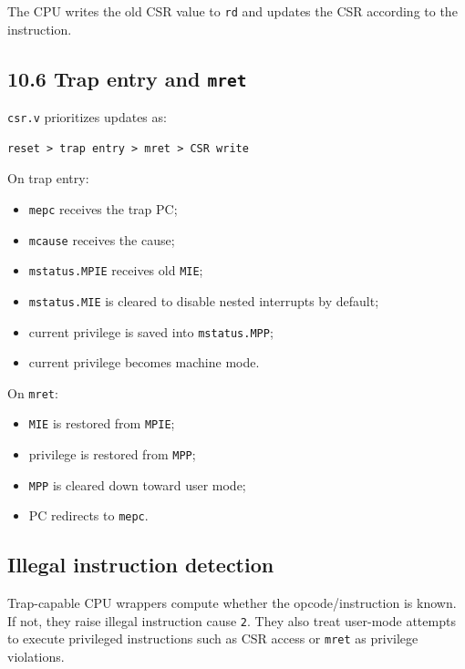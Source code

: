The CPU writes the old CSR value to \texttt{rd} and updates the CSR according to the instruction.

\subsection{10.6 Trap entry and \texttt{mret}}

\texttt{csr.v} prioritizes updates as:

\begin{lstlisting}[language={}]
reset > trap entry > mret > CSR write
\end{lstlisting}

On trap entry:

\begin{itemize}
\item \texttt{mepc} receives the trap PC;
\item \texttt{mcause} receives the cause;
\item \texttt{mstatus.MPIE} receives old \texttt{MIE};
\item \texttt{mstatus.MIE} is cleared to disable nested interrupts by default;
\item current privilege is saved into \texttt{mstatus.MPP};
\item current privilege becomes machine mode.
\end{itemize}
On \texttt{mret}:

\begin{itemize}
\item \texttt{MIE} is restored from \texttt{MPIE};
\item privilege is restored from \texttt{MPP};
\item \texttt{MPP} is cleared down toward user mode;
\item PC redirects to \texttt{mepc}.
\end{itemize}
\subsection{Illegal instruction detection}

Trap-capable CPU wrappers compute whether the opcode/instruction is known. If not, they raise illegal instruction cause \texttt{2}. They also treat user-mode attempts to execute privileged instructions such as CSR access or \texttt{mret} as privilege violations.

\bigskip
